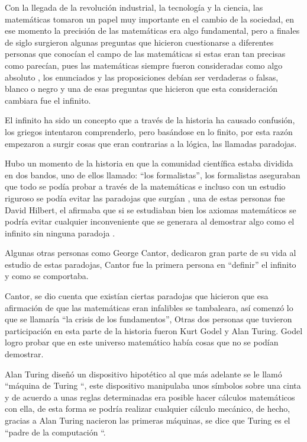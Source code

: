 \documentclass[12pt]{article}
\begin{document}
\vspace{15pt}
Con la llegada de la revolución industrial, la tecnología y la ciencia, las matemáticas tomaron un papel muy importante en el cambio de la sociedad, en ese momento la precisión de las matemáticas era algo fundamental, pero a finales de siglo surgieron algunas preguntas que hicieron cuestionarse a diferentes personas que conocían el campo de las matemáticas si estas eran tan precisas como parecían, pues las matemáticas siempre fueron consideradas como algo absoluto , los enunciados y las proposiciones debían ser verdaderas o falsas, blanco o negro  y una de esas preguntas que hicieron que esta consideración cambiara  fue el infinito. 

\vspace{15PT}
El infinito ha sido un concepto que a través de la historia ha causado confusión, los griegos intentaron comprenderlo, pero basándose en lo finito, por esta razón empezaron a surgir cosas que eran contrarias a la lógica, las llamadas paradojas.

\vspace{15PT}
Hubo un momento de la historia en que la comunidad científica estaba dividida en dos bandos, uno de ellos llamado:   “los formalistas”, los formalistas aseguraban que todo se podía probar a través de la matemáticas e incluso con un estudio riguroso se podía evitar las paradojas que surgían , una de estas personas fue David Hilbert, el afirmaba que si se estudiaban bien los axiomas matemáticos se podría evitar cualquier inconveniente que se generara al demostrar algo como el infinito sin ninguna paradoja .
 
\vspace{15PT}
Algunas otras personas como George Cantor, dedicaron gran parte de su vida al estudio de estas paradojas, Cantor fue la primera persona en “definir” el infinito y como se comportaba.

\vspace{15PT}
Cantor, se dio cuenta que existían ciertas paradojas que hicieron que esa afirmación de que las matemáticas eran infalibles se tambaleara, así comenzó lo que se llamaría “la crisis de los fundamentos”, 
Otras dos personas que tuvieron participación en esta parte de la historia fueron Kurt Godel y Alan Turing. Godel logro probar que en este universo matemático había cosas que no se podían demostrar.

\vspace{15PT}

Alan Turing diseñó un dispositivo hipotético al que más adelante se le llamó “máquina de Turing “, este dispositivo manipulaba unos símbolos sobre una cinta y de acuerdo a unas reglas determinadas era posible hacer cálculos matemáticos con ella, de esta forma se podría realizar cualquier cálculo mecánico, de hecho, gracias a Alan Turing nacieron las primeras máquinas, se dice que Turing es el “padre de la computación “.
\end{document}

